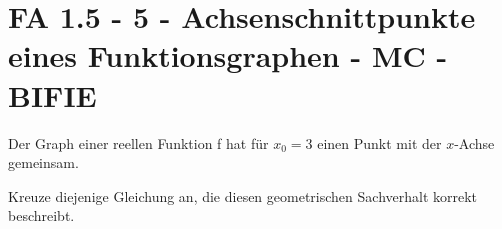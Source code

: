 \section{FA 1.5 - 5 - Achsenschnittpunkte eines Funktionsgraphen - MC - BIFIE}

\begin{beispiel}[FA 1.5]{1} %
Der Graph einer reellen Funktion f hat für $x_0 = 3$ einen Punkt mit der $x$-Achse gemeinsam. 

Kreuze diejenige Gleichung an, die diesen geometrischen Sachverhalt korrekt beschreibt.


\end{beispiel}
